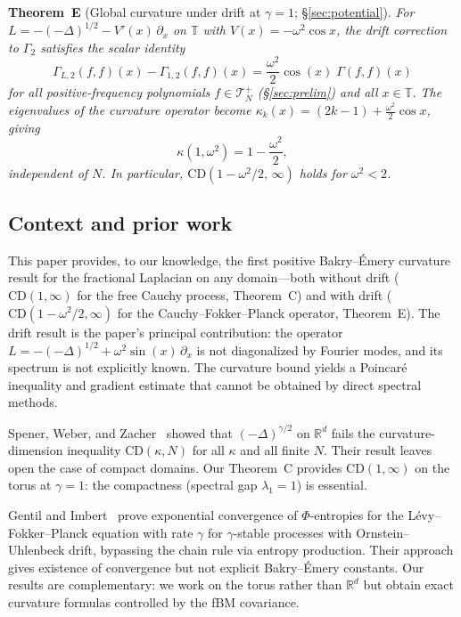 \documentclass[11pt,a4paper]{article}
\theoremstyle{plain}
\theoremstyle{definition}
\theoremstyle{remark}
\newcommand{\R}{\mathbb{R}}
\newcommand{\T}{\mathbb{T}}
\begin{document}
\medskip\noindent
\textbf{Theorem~E} (Global curvature under drift at $\gamma=1$; \S\ref{sec:potential}).
\emph{For $L = -(-\Delta)^{1/2} - V'(x)\,\partial_x$ on $\T$ with
$V(x) = -\omega^2\cos x$, the drift correction to $\Gamma_2$ satisfies
the scalar identity
\begin{equation}\label{eq:intro-drift-scalar}
  \Gamma_{L,2}(f,f)(x) - \Gamma_{1,2}(f,f)(x)
  = \frac{\omega^2}{2}\cos(x)\;\Gamma(f,f)(x)
\end{equation}
for all positive-frequency polynomials
$f \in \mathcal{T}_N^+$ (\S\ref{sec:prelim}) and all $x \in \T$.
The eigenvalues of the curvature operator become
$\kappa_k(x) = (2k{-}1) + \frac{\omega^2}{2}\cos x$, giving
\begin{equation}\label{eq:intro-E}
  \kappa(1,\omega^2) = 1 - \frac{\omega^2}{2},
\end{equation}
independent of $N$.  In particular,
$\mathrm{CD}(1-\omega^2/2,\,\infty)$ holds for $\omega^2 < 2$.}


\subsection{Context and prior work}

This paper provides, to our knowledge, the first positive
Bakry--\'Emery curvature result for the fractional Laplacian
on any domain---both without drift ($\mathrm{CD}(1,\infty)$
for the free Cauchy process, Theorem~C) and with drift
($\mathrm{CD}(1-\omega^2/2,\infty)$ for the
Cauchy--Fokker--Planck operator, Theorem~E).
The drift result is the paper's principal contribution:
the operator $L = -(-\Delta)^{1/2} + \omega^2\sin(x)\,\partial_x$
is not diagonalized by Fourier modes, and its spectrum
is not explicitly known.  The curvature bound yields
a Poincar\'e inequality and gradient estimate that cannot
be obtained by direct spectral methods.

Spener, Weber, and Zacher~\cite{SpenerWeberZacher2020} showed that
$(-\Delta)^{\gamma/2}$ on $\R^d$ fails the curvature-dimension inequality
$\mathrm{CD}(\kappa,N)$ for all $\kappa$ and all finite $N$. Their result
leaves open the case of compact domains. Our Theorem~C provides
$\mathrm{CD}(1,\infty)$ on the torus at $\gamma = 1$: the compactness
(spectral gap $\lambda_1 = 1$) is essential.

Gentil and Imbert~\cite{GentilImbert2008} prove exponential convergence
of $\Phi$-entropies for the L\'evy--Fokker--Planck equation with rate
$\gamma$ for $\gamma$-stable processes with Ornstein--Uhlenbeck drift,
bypassing the chain rule via entropy production. Their approach gives
existence of convergence but not explicit Bakry--\'Emery constants.
Our results are complementary: we work on the torus rather than $\R^d$
but obtain exact curvature formulas controlled by the fBM covariance.
\end{document}
